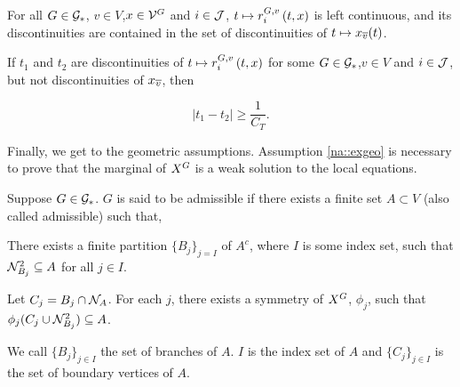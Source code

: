 \begin{nassu}
\begin{subnassu}
\label{reg::disc}

For all \(G\in \mathcal{G}_\ast\), \(v \in V\),\(x\in\mathcal{V}^{G}\) and \(i\in \mathcal{J}\), \(t\mapsto \rate\gvpara{G}{v}\stpara{i}\tmepro{t}{\xf}{}\) is left continuous, and its discontinuities are contained in the set of discontinuities of \(t\mapsto x_{\overline{v}}(t)\).
\end{subnassu}

\begin{subnassu}
\label{reg::altdisc}

 If \(t_1\) and \(t_2\) are discontinuities of \(t\mapsto \rate\gvpara{G}{v}\stpara{i}\tmepro{t}{\xf}{}\) for some \(G \in \mathcal{G}_\ast\),\(v\in V\) and \(i \in \mathcal{J}\), but not discontinuities of \(x_{\overline{v}}\), then 

\[|t_1 - t_2| \geq \frac{1}{C_T}.\]

\end{subnassu}
\end{nassu}

\lin

Finally, we get to the geometric assumptions. Assumption \ref{na::exgeo} is necessary to prove that the marginal of \(X^{G}\) is a weak solution to the local equations.

\lin

\begin{nassu}
\label{na::exgeo}

Suppose \(G \in \mathcal{G}_\ast\). \(G\) is said to be admissible if there exists a finite set \(A\subset V\) (also called admissible) such that,

\begin{subnassu}
\label{exgeo::B}
There exists a finite partition \(\{B_j\}_{j=I}\) of \(A^c\), where \(I\) is some index set, such that \(\mathcal{N}^2_{B_j} \subseteq A\) for all \(j \in I\). 
\end{subnassu}

\begin{subnassu}
\label{exgeo::C}
Let \(C_j = B_j\cap\mathcal{N}_{A}\). For each \(j\), there exists a symmetry of \(X^{G}\), \(\phi_j\), such that \(\phi_j(C_j\cup\mathcal{N}^2_{B_j}) \subseteq A\).
\end{subnassu}

We call \(\{B_j\}_{j\in I}\) the set of branches of \(A\). \(I\) is the index set of \(A\) and \(\{C_j\}_{j\in I}\) is the set of boundary vertices of \(A\). 
\end{nassu}

